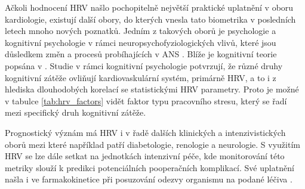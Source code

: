 Ačkoli hodnocení HRV našlo pochopitelně největší praktické uplatnění v oboru
kardiologie, existují další obory, do kterých vnesla tato biometrika v
posledních letech mnoho nových poznatků. Jedním z takových oborů je psychologie
a kognitivní psychologie v rámci neuropsychofyziologických vlivů, které jsou
důsledkem změn a procesů probíhajících v ANS \cite{Bernardi2009}. Blíže je
kognitivní teorie popsána v \cite{Forte2019,Plass2010}. Studie v rámci
kognitivní psychologie
\cite{Bernardi2009,Solhjoo2019,Salahuddin2007,Ishaque2020} potvrzují, že různé
druhy kognitivní zátěže ovliňují kardiovaskulární systém, primárně HRV, a to i z
hlediska dlouhodobých korelací se statistickými HRV parametry. Proto je možné v
tabulce \ref{tab:hrv_factors} vidět faktor typu pracovního stresu, který se řadí
mezi specifický druh kognitivní zátěže.

Prognostický význám má HRV i v řadě dalších klinických a intenzivistických oborů
mezi které například patří diabetologie, renologie a neurologie. S využitím HRV
se lze dále setkat na jednotkách intenzivní péče, kde monitorování této metriky
slouží k predikci potenciálních pooperačních komplikací. Své uplatnění našla i
ve farmakokinetice při posuzování odezvy organismu na podané léčiva
\cite{Pumprla2014}.


